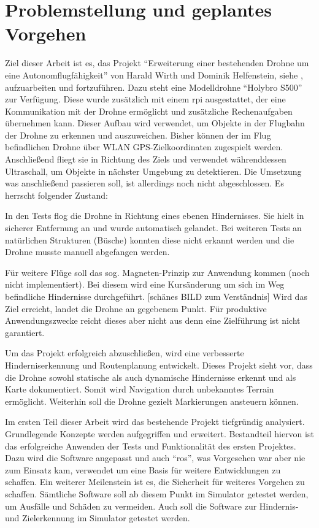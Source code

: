 
\chapter{Problemstellung und geplantes Vorgehen}
Ziel dieser Arbeit ist es, das Projekt \enquote{Erweiterung einer bestehenden Drohne um eine Autonomflugfähigkeit} von Harald Wirth und Dominik Helfenstein, siehe \cite{wirthErweiterungBestehendenDrohne2022}\cite{wirthErweiterungBestehendenDrohne2022a}, aufzuarbeiten und fortzuführen. Dazu steht eine Modelldrohne \enquote{Holybro S500} zur Verfügung. Diese wurde zusätzlich mit einem \gls{rpi} ausgestattet, der eine Kommunikation mit der Drohne ermöglicht und zusätzliche Rechenaufgaben übernehmen kann. Dieser Aufbau wird verwendet, um Objekte in der Flugbahn der Drohne zu erkennen und auszuweichen. Bisher können der im Flug befindlichen Drohne über WLAN GPS-Zielkoordinaten zugespielt werden. Anschließend fliegt sie in Richtung des Ziels und verwendet währenddessen Ultraschall, um Objekte in nächster Umgebung zu detektieren. Die Umsetzung was anschließend passieren soll, ist allerdings noch nicht abgeschlossen. Es herrscht folgender Zustand:

\begin{compactitem}
	\item In den Tests flog die Drohne in Richtung eines ebenen Hindernisses. Sie hielt in sicherer Entfernung an und wurde automatisch gelandet. Bei weiteren Tests an natürlichen Strukturen (Büsche) konnten diese nicht erkannt werden und die Drohne musste manuell abgefangen werden.
	\item Für weitere Flüge soll das sog. Magneten-Prinzip zur Anwendung kommen (noch nicht implementiert). Bei diesem wird eine Kursänderung um sich im Weg befindliche Hindernisse durchgeführt. [schänes BILD zum Verständnis] Wird das Ziel erreicht, landet die Drohne an gegebenem Punkt. Für produktive Anwendungszwecke reicht dieses aber nicht aus denn eine Zielführung ist nicht garantiert.
\end{compactitem}

Um das Projekt erfolgreich abzuschließen, wird eine verbesserte Hinderniserkennung und Routenplanung entwickelt. Dieses Projekt sieht vor, dass die Drohne sowohl statische als auch dynamische Hindernisse erkennt und als Karte dokumentiert. Somit wird Navigation durch unbekanntes Terrain    ermöglicht. Weiterhin soll die Drohne gezielt Markierungen ansteuern können.

Im ersten Teil dieser Arbeit wird das bestehende Projekt tiefgründig analysiert. Grundlegende Konzepte werden aufgegriffen und erweitert. Bestandteil hiervon ist das erfolgreiche Anwenden der Tests und Funktionalität des ersten Projektes. Dazu wird die Software angepasst und auch \enquote{\gls{ros}}, was Vorgesehen war aber nie zum Einsatz kam, verwendet um eine Basis für weitere Entwicklungen zu schaffen.\newline
Ein weiterer Meilenstein ist es, die Sicherheit für weiteres Vorgehen zu schaffen. Sämtliche Software soll ab diesem Punkt im Simulator getestet werden, um Ausfälle und Schäden zu vermeiden. Auch soll die Software zur Hindernis- und Zielerkennung im Simulator getestet werden.

